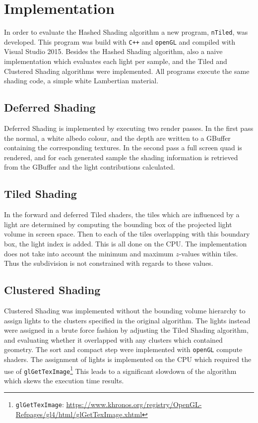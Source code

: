 \section{Implementation}

In order to evaluate the Hashed Shading algorithm a new program, \texttt{nTiled},
was developed. This program was build with \texttt{C++} and \texttt{openGL} and
compiled with Visual Studio 2015. 
Besides the Hashed Shading algorithm, also a naive implementation which evaluates each
light per sample, and the Tiled and Clustered Shading algorithms were implemented.
All programs execute the same shading code, a simple white Lambertian material.

\subsection{Deferred Shading}

Deferred Shading is implemented by executing two render passes. In the first pass
the normal, a white albedo colour, and the depth are written to a GBuffer containing
the corresponding textures. In the second pass a full screen quad is rendered, and for
each generated sample the shading information is retrieved from the GBuffer and the
light contributions calculated.

\subsection{Tiled Shading}

In the forward and deferred Tiled shaders, the tiles which are influenced
by a light are determined by computing the bounding box of the projected light volume
in screen space\cite{mara20122d}. Then to each of the tiles overlapping with this
boundary box, the light index is added. This is all done on the CPU. The implementation
does not take into account the minimum and maximum $z$-values within tiles. Thus the
subdivision is not constrained with regards to these values.

\subsection{Clustered Shading}

Clustered Shading was implemented without the bounding volume hierarchy to assign
lights to the clusters specified in the original algorithm. The lights instead were
assigned in a brute force fashion by adjusting the Tiled Shading algorithm, and evaluating
whether it overlapped with any clusters which contained geometry. The sort and compact
step were implemented with \texttt{openGL} compute shaders. The assignment of lights is
implemented on the CPU which required the use of
\texttt{glGetTexImage}\footnote{\texttt{glGetTexImage}: {\tiny\url{https://www.khronos.org/registry/OpenGL-Refpages/gl4/html/glGetTexImage.xhtml}}}
This leads to a significant slowdown of the algorithm which skews the execution time results.

